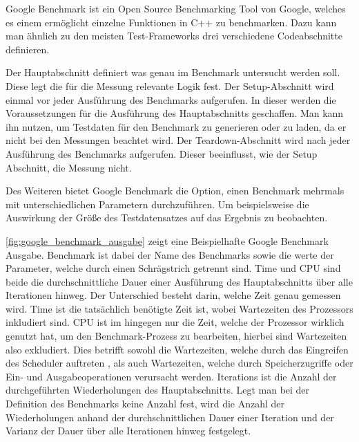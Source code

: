 Google Benchmark ist ein Open Source Benchmarking Tool von Google,
welches es einem ermöglicht einzelne Funktionen in C++ zu benchmarken. 
Dazu kann man ähnlich zu den meisten Test-Frameworks drei verschiedene
Codeabschnitte definieren.

Der Hauptabschnitt definiert was genau im Benchmark untersucht werden
soll. Diese legt die für die Messung relevante Logik fest.
Der \foreignlanguage{english}{Setup}-Abschnitt wird einmal vor jeder Ausführung des Benchmarks
aufgerufen. In dieser werden die Voraussetzungen für die Ausführung des Hauptabschnitts
geschaffen. Man kann ihn \zB nutzen, um Testdaten für den Benchmark
zu generieren oder zu laden, da er nicht bei den Messungen beachtet wird.
Der \foreignlanguage{english}{Teardown}-Abschnitt wird nach jeder Ausführung des Benchmarks aufgerufen.
Dieser beeinflusst, wie der Setup Abschnitt, die Messung nicht.

Des Weiteren bietet Google Benchmark die Option, einen Benchmark mehrmals mit
unterschiedlichen Parametern durchzuführen. Um beispielsweise die Auswirkung
der Größe des Testdatensatzes auf das Ergebnis zu beobachten.

\autoref{fig:google_benchmark_ausgabe} zeigt eine Beispielhafte Google
Benchmark Ausgabe. Benchmark ist dabei der Name des Benchmarks sowie die werte
der Parameter, welche durch einen Schrägstrich getrennt sind.
\foreignlanguage{english}{Time} und CPU sind beide die durchschnittliche Dauer einer
Ausführung des Hauptabschnitts über alle Iterationen hinweg. Der Unterschied
besteht darin, welche Zeit genau gemessen wird. \foreignlanguage{english}{Time}
ist die tatsächlich benötigte Zeit ist, wobei Wartezeiten des Prozessors
inkludiert sind. CPU ist im hingegen nur die Zeit, welche der Prozessor
wirklich genutzt hat, um den Benchmark-Prozess zu bearbeiten, hierbei sind
Wartezeiten also exkludiert. Dies betrifft sowohl die Wartezeiten, welche durch
das Eingreifen des \foreignlanguage{english}{Scheduler} auftreten
\autocite[vgl.][184]{RoundRobin}, als auch Wartezeiten, welche durch \zB
Speicherzugriffe oder Ein- und Ausgabeoperationen verursacht werden.
\foreignlanguage{english}{Iterations}
ist die Anzahl der durchgeführten Wiederholungen des Hauptabschnitts. Legt man
bei der Definition des Benchmarks keine Anzahl fest, wird die Anzahl der
Wiederholungen anhand der durchschnittlichen Dauer einer Iteration und der
Varianz der Dauer über alle Iterationen hinweg festgelegt.
\autocite[Vgl.][]{GoogleBenchmark}

